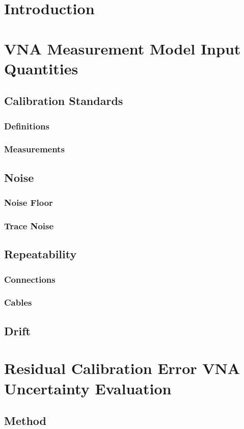\documentclass[../thesis/thesis.tex]{subfiles}
\begin{document}
\begin{refsection}
\section{Introduction}
\section{VNA Measurement Model Input Quantities}
\subsection{Calibration Standards}
\subsubsection{Definitions}
\subsubsection{Measurements}
\subsection{Noise}
\subsubsection{Noise Floor}
\subsubsection{Trace Noise}
\subsection{Repeatability}
\subsubsection{Connections}
\subsubsection{Cables}
\subsection{Drift}
\section{Residual Calibration Error VNA Uncertainty Evaluation}
\subsection{Method}

\end{refsection}
\end{document}
